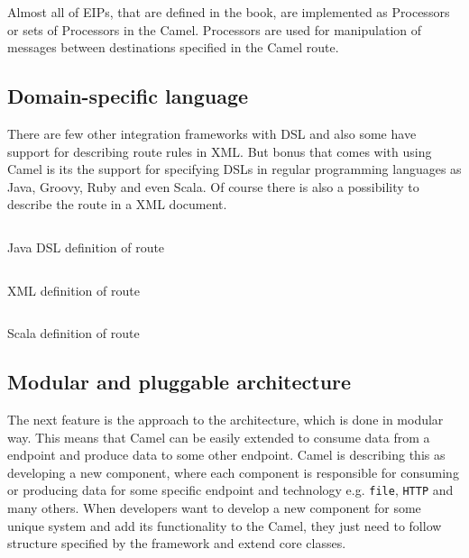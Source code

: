 \documentclass[12pt,final,oneside]{fithesis2}
\begin{document}
Almost all of EIPs, that are defined in the book, are implemented as Processors or sets of Processors in the Camel. Processors are used for manipulation of messages between destinations specified in the Camel route.\cite{camel-dzone}



\subsection*{Domain-specific language}
There are few other integration frameworks with DSL and also some have support for describing route rules in XML. But bonus that comes with using Camel is its the support for specifying DSLs in regular programming languages as Java, Groovy, Ruby and even Scala. Of course there is also a possibility to describe the route in a XML document. 

\begin{listing}[ht]
	\inputminted[]{java}{sources/java_dsl_example.java}
	\caption{Java DSL definition of route}

\end{listing}

\begin{listing}[ht]
	\inputminted[]{xml}{sources/xml_example.xml}
	\caption{XML definition of route }

\end{listing}

\begin{listing}[ht, p!]
	\inputminted[]{java}{sources/scala_example.java}
	\caption{Scala definition of route }

\end{listing}


\subsection*{Modular and pluggable architecture}
The next feature is the approach to the architecture, which is done in modular way. This means that Camel can be easily extended to consume data from a endpoint and produce data to some other endpoint. Camel is describing this as developing a new component, where each component is responsible for consuming or producing data for some specific endpoint and technology e.g. \texttt{file}, \texttt{HTTP} and many others. When developers want to develop a new component for some unique system and add its functionality to the Camel, they just need to follow structure specified by the framework and extend core classes. 
\end{document}
